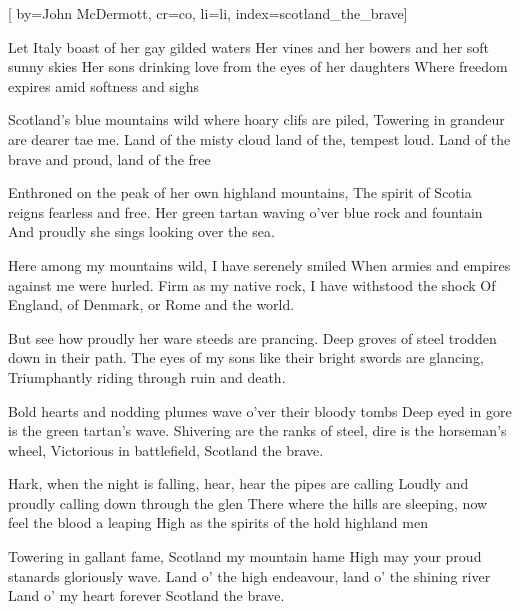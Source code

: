 

[%
    by={John McDermott},
    cr={co},
    li={li},
    index={scotland_the_brave}]


    \label{scotland_the_brave}

    \beginverse\memorize[verse]
        Let Italy boast of her gay gilded waters
        Her vines and her bowers and her soft sunny skies
        Her sons drinking love from the eyes of her daughters
        Where freedom expires amid softness and sighs
    \endverse

    \beginchorus\memorize[chorus]
        Scotland's blue mountains wild where hoary clifs are piled,
        Towering in grandeur are dearer tae me.
        Land of the misty cloud land of the, tempest loud.
        Land of the brave and proud, land of the free
    \endchorus

    \beginverse\replay[verse]
        Enthroned on the peak of her own highland mountains,
        The spirit of Scotia reigns fearless and free.
        Her green tartan waving o'ver blue rock and fountain
        And proudly she sings looking over the sea.
    \endverse

    \beginchorus\replay[chorus]
        Here among my mountains wild, I  have serenely smiled
        When armies and empires against me were hurled.
        Firm as my native rock, I have withstood the shock
        Of England, of Denmark, or Rome and the world.
    \endchorus

    \beginverse\replay[verse]
        But see how proudly her ware steeds are prancing.
        Deep groves of steel trodden down in their path.
        The eyes of my sons like their bright swords are glancing,
        Triumphantly riding through ruin and death.
    \endverse

    \beginchorus\replay[chorus]
        Bold hearts and nodding plumes wave o'ver their bloody tombs
        Deep eyed in gore is the green tartan's wave.
        Shivering are the ranks of steel, dire is the horseman's wheel,
        Victorious in battlefield, Scotland the brave.
    \endchorus

    \beginverse\replay[verse]
        Hark, when the night is falling, hear, hear the pipes are calling
        Loudly and proudly calling down through the glen
        There where the hills are sleeping, now feel the blood a leaping
        High as the spirits of the hold highland men
    \endverse

    \beginchorus\replay[chorus]
        Towering in gallant fame, Scotland my mountain hame
        High may your proud stanards gloriously wave.
        Land o' the high endeavour, land o' the shining river
        Land o' my heart forever Scotland the brave.
    \endchorus
\endsong
